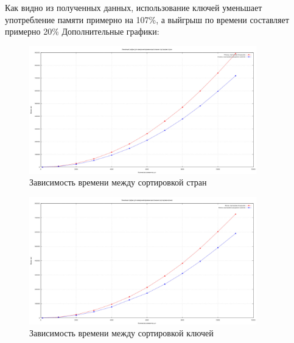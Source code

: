 Как видно из полученных данных, использование ключей уменьшает употребление памяти примерно на 107\%, а выйгрыш по времени составляет примерно 20\%\newline
Дополнительные графики:
\begin{figure}[ht]
	\centering
	\includegraphics[width=0.88\textwidth]{img/linear_time_together_countries.jpg}
	\captionsetup{font=footnotesize}
	\caption{Зависимость времени между сортировкой стран}
	\label{fig:03}
\end{figure}

\begin{figure}[ht]
	\centering
	\includegraphics[width=0.88\textwidth]{img/linear_time_together_keys.jpg}
	\captionsetup{font=footnotesize}
	\caption{Зависимость времени между сортировкой ключей}
	\label{fig:04}
\end{figure}